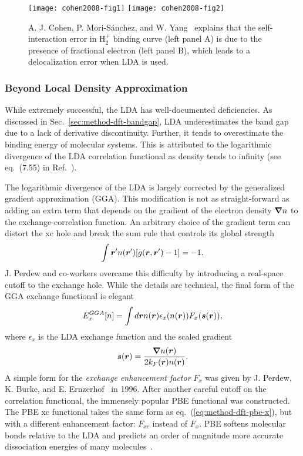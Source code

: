 \begin{figure}[h]
\texttt{[image: cohen2008-fig1]}
\texttt{[image: cohen2008-fig2]}
\caption{A. J. Cohen, P. Mori-S\'anchez, and W. Yang~\cite{Cohen2008} explains that the self-interaction error in H$_2^+$ binding curve (left panel A) is due to the presence of fractional electron (left panel B), which leads to a delocalization error when LDA is used.}
\label{fig:method-dft-smooth-lda}
\end{figure}


\subsubsection{Beyond Local Density Approximation}

While extremely successful, the LDA has well-documented deficiencies.
As discussed in Sec.~\ref{sec:method-dft-bandgap}, LDA underestimates the band gap due to a lack of derivative discontinuity.
Further, it tends to overestimate the binding energy of molecular systems. This is attributed to the logarithmic divergence of the LDA correlation functional as density tends to infinity (see eq.~(7.55) in Ref.~\cite{Giuliani2005}).

The logarithmic divergence of the LDA is largely corrected by the generalized gradient approximation (GGA). This modification is not as straight-forward as adding an extra term that depends on the gradient of the electron density $\boldsymbol{\nabla}n$ to the exchange-correlation function. An arbitrary choice of the gradient term can distort the xc hole and break the sum rule that controls its global strength
\begin{align}
\int\boldsymbol{r}' n(\boldsymbol{r}')[g(\boldsymbol{r},\boldsymbol{r}')-1] = -1.
\end{align}
J. Perdew and co-workers overcame this difficulty by introducing a real-space cutoff to the exchange hole. While the details are technical, the final form of the GGA exchange functional is elegant
\begin{align} \label{eq:method-dft-pbe-x}
E_x^{GGA}[n] = \int d\boldsymbol{r} n(\boldsymbol{r})\epsilon_x(n(\boldsymbol{r}))F_x(\boldsymbol{s}(\boldsymbol{r})),
\end{align}
where $\epsilon_x$ is the LDA exchange function and the scaled gradient
\begin{align}
\boldsymbol{s}(\boldsymbol{r}) = \dfrac{\boldsymbol{\nabla}n(\boldsymbol{r})}{2k_F(\boldsymbol{r})n(\boldsymbol{r})}.
\end{align}
A simple form for the \emph{exchange enhancement factor} $F_x$ was given by J. Perdew, K. Burke, and E. Ernzerhof~\cite{Perdew1996} in 1996. After another careful cutoff on the correlation functional, the immensely popular PBE functional was constructed. The PBE xc functional takes the same form as eq.~(\ref{eq:method-dft-pbe-x}), but with a different enhancement factor: $F_{xc}$ instead of $F_x$.
PBE softens molecular bonds relative to the LDA and predicts an order of magnitude more accurate dissociation energies of many molecules~\cite{Perdew1996}.

